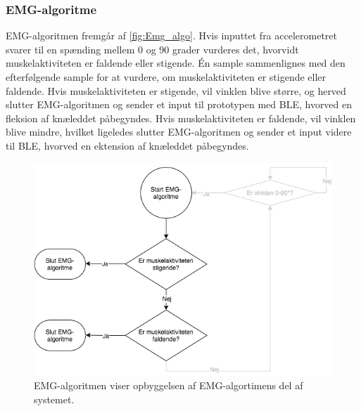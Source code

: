 \subsubsection{EMG-algoritme}
EMG-algoritmen fremgår af \autoref{fig:Emg_algo}. Hvis inputtet fra accelerometret svarer til en spænding mellem 0 og 90 grader vurderes det, hvorvidt muskelaktiviteten er faldende eller stigende. Én sample sammenlignes med den efterfølgende sample for at vurdere, om muskelaktiviteten er stigende eller faldende. Hvis muskelaktiviteten er stigende, vil vinklen blive større, og herved slutter EMG-algoritmen og sender et input til prototypen med BLE, hvorved en fleksion af knæleddet påbegyndes. Hvis muskelaktiviteten er faldende, vil vinklen blive mindre, hvilket ligeledes slutter EMG-algoritmen og sender et input videre til BLE, hvorved en ektension af knæleddet påbegyndes. 
\begin{figure}[H]
\centering
\includegraphics[width=1.0\textwidth]{figures/implementering/EMG_algo.png}
\caption{EMG-algoritmen viser opbyggelsen af EMG-algortimens del af systemet.}
\label{fig:Emg_algo}
\end{figure}

